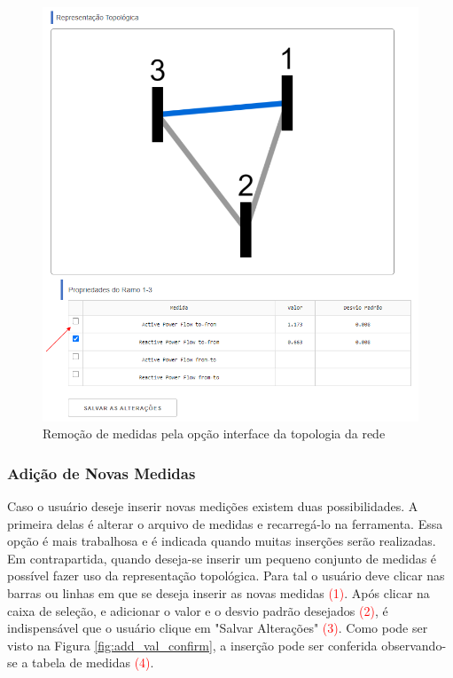 \documentclass{article}
\begin{document}
\begin{figure}[H]
    \centering
    \includegraphics[scale=.45]{Imagens/Remoção_de_medidas_Topologia.PNG}
    \caption{Remoção de medidas pela opção interface da topologia da rede}
    \label{fig:remov_med_top}
\end{figure}



\subsubsection{Adição de Novas Medidas}
Caso o usuário deseje inserir novas medições existem duas possibilidades. A primeira delas é alterar o arquivo de medidas e recarregá-lo na ferramenta. Essa opção é mais trabalhosa e é indicada quando muitas inserções serão realizadas. Em contrapartida, quando deseja-se inserir um pequeno conjunto de medidas é possível fazer uso da representação topológica. Para tal o usuário deve clicar nas barras ou linhas em que se deseja inserir as novas medidas \textcolor{red}{(1)}. Após clicar na caixa de seleção, e adicionar o valor e o desvio padrão desejados \textcolor{red}{(2)}, é indispensável que o usuário clique em "Salvar Alterações" \textcolor{red}{(3)}. Como pode ser visto na Figura \ref{fig:add_val_confirm}, a inserção pode ser conferida observando-se a tabela de medidas \textcolor{red}{(4)}.  
\end{document}
